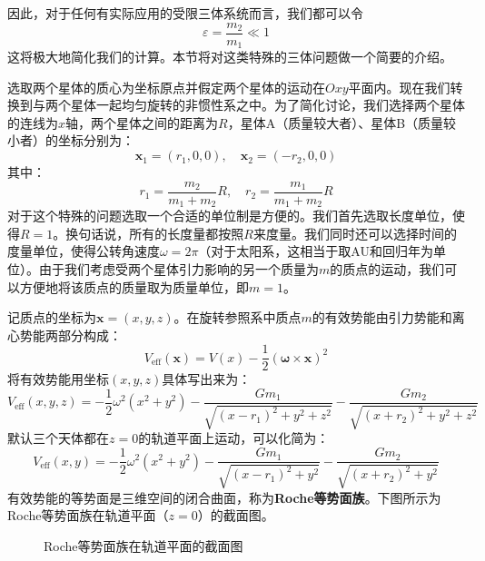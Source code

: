 \documentclass[a4paper,openany]{book}
\begin{document}
因此，对于任何有实际应用的受限三体系统而言，我们都可以令
\[
    \varepsilon = \frac{m_2}{m_1} \ll 1
\]
这将极大地简化我们的计算。本节将对这类特殊的三体问题做一个简要的介绍。

选取两个星体的质心为坐标原点并假定两个星体的运动在$Oxy$平面内。现在我们转换到与两个星体一起均匀旋转的非惯性系之中。为了简化讨论，我们选择两个星体的连线为$x$轴，两个星体之间的距离为$R$，星体A（质量较大者）、星体B（质量较小者）的坐标分别为：
\[
    \bm{x}_1 = (r_1,0,0),\quad \bm{x}_2 = (-r_2,0,0)
\]
其中：
\[
    r_1 = \frac{m_2}{m_1+m_2}R,\quad r_2 = \frac{m_1}{m_1+m_2}R
\]
对于这个特殊的问题选取一个合适的单位制是方便的。我们首先选取长度单位，使得$R=1$。换句话说，所有的长度量都按照$R$来度量。我们同时还可以选择时间的度量单位，使得公转角速度$\omega = 2\pi$（对于太阳系，这相当于取AU和回归年为单位）。由于我们考虑受两个星体引力影响的另一个质量为$m$的质点的运动，我们可以方便地将该质点的质量取为质量单位，即$m = 1$。

记质点的坐标为$\bm{x} = (x,y,z)$。在旋转参照系中质点$m$的有效势能由引力势能和离心势能两部分构成：
\[
    V_{\mathrm{eff}}(\bm{x}) = V(x) - \frac{1}{2}\left(\bm{\omega}\times\bm{x}\right)^2
\]
将有效势能用坐标$(x,y,z)$具体写出来为：
\[
    V_{\mathrm{eff}}(x,y,z) = -\frac{1}{2}\omega^2(x^2 + y^2) - \frac{Gm_1}{\sqrt{(x-r_1)^2 + y^2 + z^2}} - \frac{Gm_2}{\sqrt{(x+r_2)^2 + y^2 + z^2}}
\]
默认三个天体都在$z=0$的轨道平面上运动，可以化简为：
\[
    V_{\mathrm{eff}}(x,y) = -\frac{1}{2}\omega^2(x^2 + y^2) - \frac{Gm_1}{\sqrt{(x-r_1)^2 + y^2}} - \frac{Gm_2}{\sqrt{(x+r_2)^2 + y^2}}
\]
有效势能的等势面是三维空间的闭合曲面，称为\textbf{Roche等势面族}。下图所示为Roche等势面族在轨道平面（$z=0$）的截面图。

\begin{figure}[ht!]
    \centering
    \caption{\kaishu Roche等势面族在轨道平面的截面图}
\end{figure}
\end{document}
